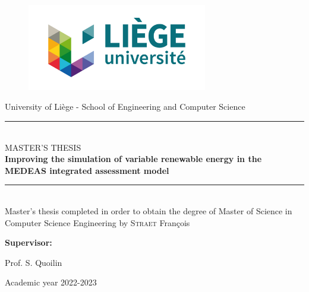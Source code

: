 \documentclass[12pt]{article}
\numberwithin{equation}{section}
\numberwithin{figure}{section}
\numberwithin{table}{section}
\begin{document}

\begin{titlepage}

    \begin{center}

    \begin{figure}[t]
        \includegraphics[width=0.7\textwidth]{uliege-logo-couleurs-300.jpg}
        \centering
    \end{figure}
    \large University of Liège - School of Engineering and Computer Science\\[0.5cm]

    \rule{\linewidth}{0.5mm}\\[0.2cm]

    \textsc{\Large MASTER'S THESIS}\\[0.5cm]

    \textbf{\LARGE Improving the simulation of variable renewable energy in the MEDEAS integrated assessment model}

        \rule{\linewidth}{0.5mm}\\[2cm]

        Master's thesis completed in order to obtain the degree of Master of Science in Computer Science Engineering by \textsc{Straet} François\\[4cm]

    \end{center}

    \textbf{Supervisor:}

    Prof. S. Quoilin\\[1.5cm]
    

    \center

    Academic year 2022-2023

\end{titlepage}
















\nocite{*}


\printbibliography[heading=bibintoc]

\setcounter{tocdepth}{0}
\setcounter{secnumdepth}{0}


\end{document}
